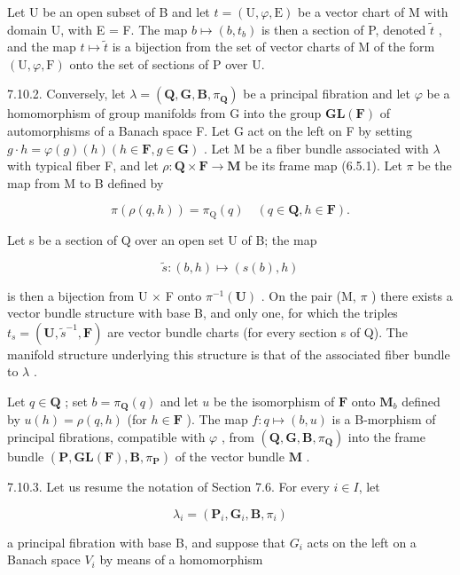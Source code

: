 Let U be an open subset of B and let \(t = (\mathrm{U}, \varphi, \mathrm{E})\) be a vector chart of M with domain U, with E = F. The map \(b \mapsto (b, t_{b})\) is then a section of P, denoted \(\tilde{t}\) , and the map \(t \mapsto \tilde{t}\) is a bijection from the set of vector charts of M of the form \((\mathrm{U}, \varphi, \mathrm{F})\) onto the set of sections of P over U.

7.10.2. Conversely, let \(\lambda = (\mathbf{Q}, \mathbf{G}, \mathbf{B}, \pi_{\mathbf{Q}})\) be a principal fibration and let \(\varphi\) be a homomorphism of group manifolds from G into the group \(\mathbf{GL}(\mathbf{F})\) of automorphisms of a Banach space F. Let G act on the left on F by setting \(g \cdot h = \varphi(g)(h) (h \in \mathbf{F}, g \in \mathbf{G})\) . Let M be a fiber bundle associated with \(\lambda\) with typical fiber F, and let \(\rho: \mathbf{Q} \times \mathbf{F} \to \mathbf{M}\) be its frame map (6.5.1). Let \(\pi\) be the map from M to B defined by

\[
\pi (\rho (q, h)) = \pi_ {\mathrm{Q}} (q) \quad (q \in \mathbf{Q}, h \in \mathbf{F}).
\]

Let s be a section of Q over an open set U of B; the map

\[
\tilde {s}: (b, h) \mapsto (s (b), h)
\]

is then a bijection from U \(\times\) F onto \(\pi^{-1}(\mathbf{U})\) . On the pair (M, \(\pi\) ) there exists a vector bundle structure with base B, and only one, for which the triples \(t_{s} = (\mathbf{U}, \tilde{s}^{-1}, \mathbf{F})\) are vector bundle charts (for every section s of Q). The manifold structure underlying this structure is that of the associated fiber bundle to \(\lambda\) .

Let \(q \in \mathbf{Q}\) ; set \(b = \pi_{\mathbf{Q}}(q)\) and let \(u\) be the isomorphism of \(\mathbf{F}\) onto \(\mathbf{M}_b\) defined by \(u(h) = \rho(q, h)\) (for \(h \in \mathbf{F}\) ). The map \(f: q \mapsto (b, u)\) is a B-morphism of principal fibrations, compatible with \(\varphi\) , from \((\mathbf{Q}, \mathbf{G}, \mathbf{B}, \pi_{\mathbf{Q}})\) into the frame bundle \((\mathbf{P}, \mathbf{GL}(\mathbf{F}), \mathbf{B}, \pi_{\mathbf{P}})\) of the vector bundle \(\mathbf{M}\) .

7.10.3. Let us resume the notation of Section 7.6. For every \(i \in I\), let

\[
\lambda_ {i} = (\mathbf {P} _ {i}, \mathbf {G} _ {i}, \mathbf {B}, \pi_ {i})
\]

a principal fibration with base B, and suppose that \(G_{i}\) acts on the left on a Banach space \(V_{i}\) by means of a homomorphism

